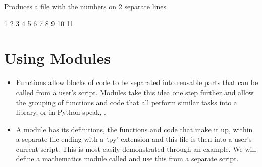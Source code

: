 \documentclass[letterpaper,10pt,english,openany]{sphinxmanual}
\begin{document}
\begin{sphinxVerbatim}[commandchars=\\\{\}]
 
   
   
\end{sphinxVerbatim}

Produces a file with the numbers on 2 separate lines

\begin{sphinxVerbatim}[commandchars=\\\{\}]
 1 2 3 4 5 6
 7 8 9 10 11
\end{sphinxVerbatim}



\section{Using Modules}
\label{\detokenize{introduction_to_python/using_modules:using-modules}}\label{\detokenize{introduction_to_python/using_modules:id1}}\label{\detokenize{introduction_to_python/using_modules::doc}}\begin{itemize}
\item {} 
Functions allow blocks of code to be separated into reusable parts
that can be called from a user’s script. Modules take this idea one
step further and allow the grouping of functions and code that all
perform similar tasks into a library, or in Python speak, .

\item {} 
A module has its definitions, the functions and code that make it up,
within a separate file ending with a ‘.py’ extension and this file is
then  into a user’s current script. This is most easily
demonstrated through an example. We will define a mathematics module
called  and use this from a separate script.

\end{itemize}
\end{document}

